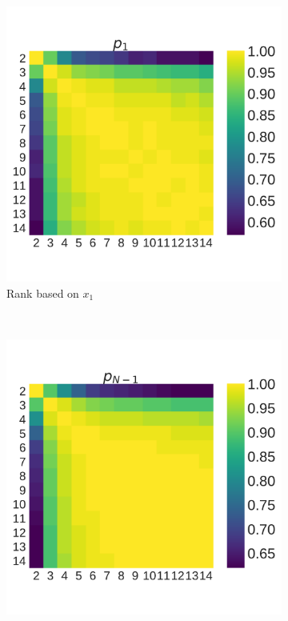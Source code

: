 \documentclass[10pt,letterpaper]{article}
\begin{document}
\begin{figure}[!htbp]
    \centering
    \begin{subfigure}[t]{.3\columnwidth}
        \centering
        \includegraphics[width=\columnwidth]{./correlation_heatmap_invade.pdf}
        \caption{Rank based on \(x_1\)}
    \end{subfigure}
    ~
    \begin{subfigure}[t]{.3\columnwidth}
        \centering
        \includegraphics[width=\columnwidth]{./correlation_heatmap_resist.pdf}

\end{subfigure}
\end{figure}
\end{document}
